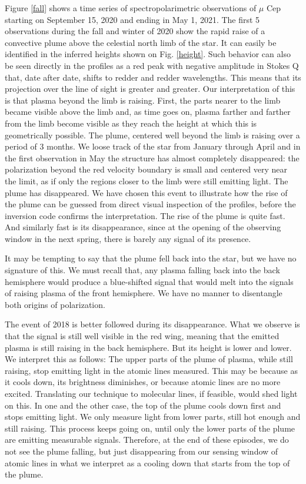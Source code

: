 \documentclass{/Users/art2/TeX/aanda/aa}
\begin{document}
Figure \ref{fall} shows a time series of spectropolarimetric observations of $\mu$ Cep starting on September 15, 2020 and ending in May 1, 2021. The first 5 observations during the fall and winter of 2020 show the rapid raise of a convective plume above the celestial north limb of the star. It can easily be identified in the inferred heights shown on Fig. \ref{height}. Such behavior can also be seen directly in the profiles  as a red peak with negative amplitude in Stokes Q that, date after date, shifts to redder and redder wavelengths. This means that its projection over the line of sight is greater and greater. Our interpretation of this is that plasma beyond the limb is raising. First, the parts nearer to the limb became visible above the limb and, as time goes on, plasma farther and farther from the limb become visible as they reach the height at which this is geometrically possible. The plume, centered well beyond the limb is raising over a period of 3 months. We loose track of the star from January through April and in the first observation in May the structure has almost completely disappeared: the polarization beyond the red velocity boundary is small and centered very near the limit, as if only the regions closer to the limb were still emitting light. The plume has disappeared.  We have chosen this event to illustrate how the rise of the plume can be guessed from direct visual inspection of the profiles, before the inversion code confirms the interpretation. The rise of the plume is quite fast. And similarly fast is its disappearance, since at the opening of the observing window in the next spring, there is barely any signal of its presence. 

It may be tempting to say that the plume fell back into the star, but we have no signature of this. We must recall that, any plasma falling back into the back hemisphere would produce a blue-shifted signal that would melt into the signals of raising plasma of the front hemisphere. We have no manner to disentangle both origins of polarization. 

The event of 2018 is better followed during its disappearance. What we observe is that the signal is still well visible in the red wing, meaning that the emitted plasma is still raising in the back hemisphere. But its height is lower and lower. We interpret this as follows: The upper parts of the plume of plasma, while still raising, stop emitting light in the atomic lines measured. This may be because as it cools down, its brightness diminishes, or because atomic lines are no more excited. Translating our technique to molecular lines, if feasible, would shed light on this. In one and the other case, the top of the plume cools down first and stops emitting light. We only measure light from lower parts, still hot enough and still raising. This process keeps going on, until only the lower parts of the plume are emitting measurable signals. Therefore, at the end of these episodes, we  do not see the plume falling, but just disappearing from our sensing window of atomic lines in what we interpret as a cooling down that starts from the top of the plume.
\end{document}
